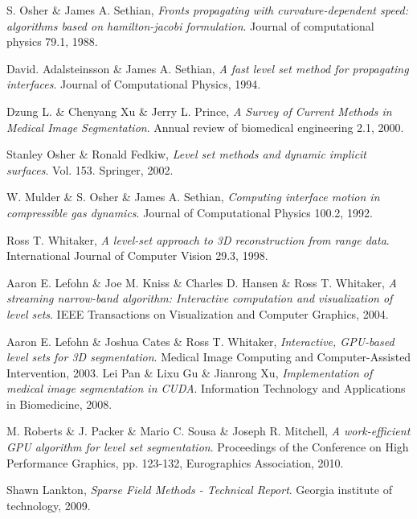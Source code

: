 \begin{thebibliography}{99}

	S. Osher \& James A. Sethian,
	\emph{Fronts propagating with curvature-dependent speed: algorithms based on hamilton-jacobi formulation}.
	Journal of computational physics 79.1,
	1988.
	
	David. Adalsteinsson \& James A. Sethian,
	\emph{A fast level set method for propagating interfaces}.
	Journal of Computational Physics,
	1994.

	Dzung L. \& Chenyang Xu \& Jerry L. Prince, 
	\emph{A Survey of Current Methods in Medical Image Segmentation}.
	Annual review of biomedical engineering 2.1,
	2000.

	Stanley Osher \& Ronald Fedkiw,
	\emph{Level set methods and dynamic implicit surfaces}.
	Vol. 153. Springer,
	2002.

	W. Mulder \& S. Osher \& James A. Sethian,
	\emph{Computing interface motion in compressible gas dynamics}.
	Journal of Computational Physics 100.2,
	1992.

	Ross T. Whitaker,
	\emph{A level-set approach to 3D reconstruction from range data}.
	International Journal of Computer Vision 29.3,
	1998.

	Aaron E. Lefohn \& Joe M. Kniss \& Charles D. Hansen \& Ross T. Whitaker,
	\emph{A streaming narrow-band algorithm: Interactive computation and visualization of level sets}.
	IEEE Transactions on Visualization and Computer Graphics,
	2004.

	Aaron E. Lefohn \& Joshua Cates \& Ross T. Whitaker,
	\emph{Interactive, GPU-based level sets for 3D segmentation}.
	 Medical Image Computing and Computer-Assisted Intervention,
	2003.
	Lei Pan \& Lixu Gu \& Jianrong Xu,
	\emph{Implementation of medical image segmentation in CUDA}.
	Information Technology and Applications in Biomedicine,
	2008.

	M. Roberts \& J. Packer \& Mario C. Sousa \& Joseph R. Mitchell,
	\emph{A work-efficient GPU algorithm for level set segmentation}.
	Proceedings of the Conference on High Performance Graphics, pp. 123-132, Eurographics Association,
	2010.

	Shawn Lankton,
	\emph{Sparse Field Methods - Technical Report}.
	Georgia institute of technology,
	2009.

	

\end{thebibliography}
